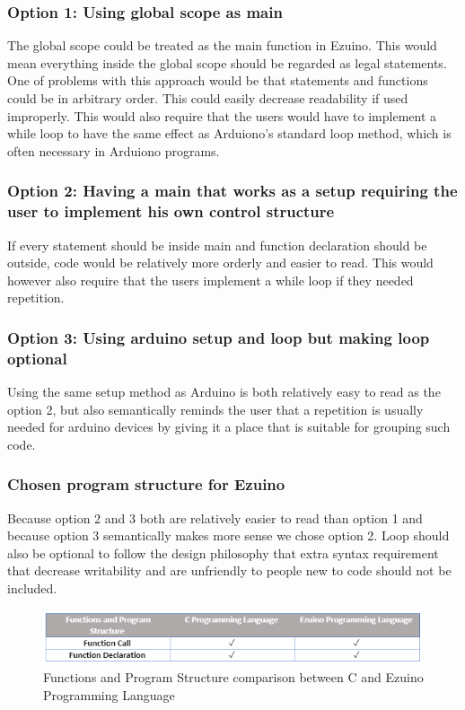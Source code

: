 \subsubsection{Option 1: Using global scope as main}
The global scope could be treated as the main function in Ezuino. This would mean everything inside the global scope should be regarded as legal statements. One of problems with this approach would be that statements and functions could be in arbitrary order. This could easily decrease readability if used improperly.
This would also require that the users would have to implement a while loop to have the same effect as Arduiono's standard loop method, which is often necessary in Arduiono programs. 


\subsubsection{Option 2: Having a main that works as a setup requiring the user to implement his own control structure}
If every statement should be inside main and function declaration should be outside, code would be relatively more orderly and easier to read. 
This would however also require that the users implement a while loop if they needed repetition. 


\subsubsection{Option 3: Using arduino setup and loop but making loop optional}
Using the same setup method as Arduino is both relatively easy to read as the option 2, but also semantically reminds the user that a repetition is usually needed for arduino devices by giving it a place that is suitable for grouping such code.


\subsubsection{Chosen program structure for Ezuino}
Because option 2 and 3 both are relatively easier to read than option 1 and because option 3 semantically makes more sense we chose option 2. Loop should also be optional to follow the design philosophy that extra syntax requirement that decrease writability and are unfriendly to people new to code should not be included. 
\begin{figure}[H]
\centering
\caption{Functions and Program Structure comparison between C and Ezuino Programming Language}
\includegraphics[scale=0.80]{figures/language_features/langf10.png}

\label{lf10}
\end{figure}
